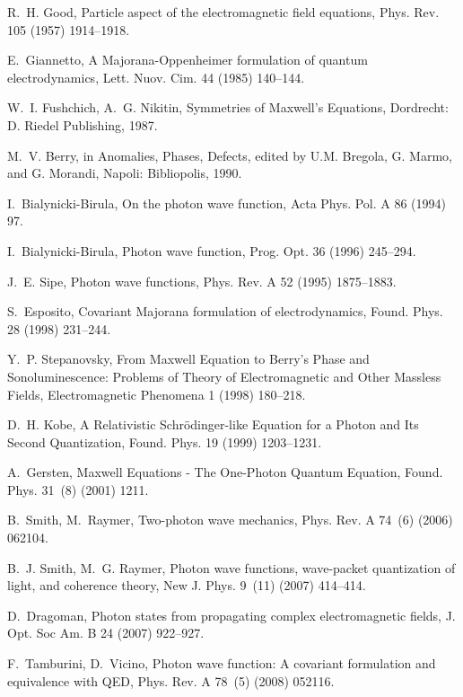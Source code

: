 \documentclass[1p,sort&compress]{elsarticle}
\numberwithin{equation}{section}
\begin{document}
\begin{thebibliography}{999}
R.~H. Good, {Particle aspect of the electromagnetic field equations}, Phys.
  Rev. 105 (1957) 1914--1918.

E.~Giannetto, {A Majorana-Oppenheimer formulation of quantum electrodynamics},
  Lett. Nuov. Cim. 44 (1985) 140--144.

W.~I. Fushchich, A.~G. Nikitin, {Symmetries of Maxwell's Equations}, Dordrecht:
  D. Riedel Publishing, 1987.

M.~V. Berry, {in Anomalies, Phases, Defects, edited by U.M. Bregola, G. Marmo,
  and G. Morandi}, Napoli: Bibliopolis, 1990.

I.~Bialynicki-Birula, {On the photon wave function}, Acta Phys. Pol. A 86
  (1994) 97.

I.~Bialynicki-Birula, {Photon wave function}, Prog. Opt. 36 (1996) 245--294.

J.~E. Sipe, {Photon wave functions}, Phys. Rev. A 52 (1995) 1875--1883.

S.~Esposito, {Covariant Majorana formulation of electrodynamics}, Found. Phys.
  28 (1998) 231--244.

Y.~P. Stepanovsky, {From Maxwell Equation to Berry's Phase and
  Sonoluminescence: Problems of Theory of Electromagnetic and Other Massless
  Fields}, Electromagnetic Phenomena 1 (1998) 180--218.

D.~H. Kobe, {A Relativistic Schr\"odinger-like Equation for a Photon and Its
  Second Quantization}, Found. Phys. 19 (1999) 1203--1231.

A.~Gersten, {Maxwell Equations - The One-Photon Quantum Equation}, Found. Phys.
  31~(8) (2001) 1211.

B.~Smith, M.~Raymer, {Two-photon wave mechanics}, Phys. Rev. A 74~(6) (2006)
  062104.

B.~J. Smith, M.~G. Raymer, {Photon wave functions, wave-packet quantization of
  light, and coherence theory}, New J. Phys. 9~(11) (2007) 414--414.

D.~Dragoman, {Photon states from propagating complex electromagnetic fields},
  J. Opt. Soc Am. B 24 (2007) 922--927.

F.~Tamburini, D.~Vicino, {Photon wave function: A covariant formulation and
  equivalence with QED}, Phys. Rev. A 78~(5) (2008) 052116.


\end{thebibliography}
\end{document}
